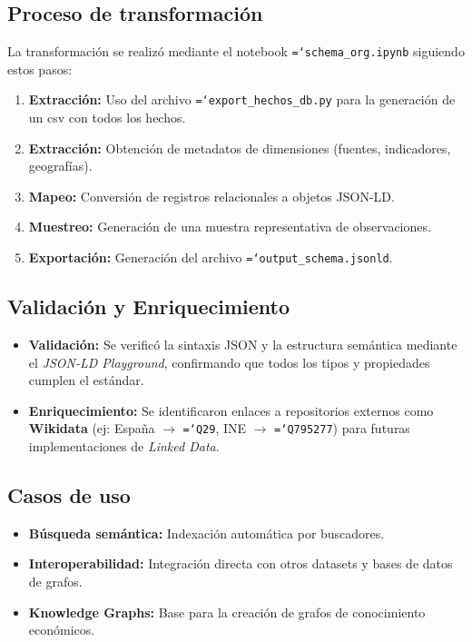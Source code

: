 \documentclass{article}
\let\oldtexttt\texttt  %
\renewcommand{\texttt}[1]{{\footnotesize\oldtexttt{\hyphenchar\font=`\-#1}}}  %
\begin{document}
\subsection{Proceso de transformaci\'on}

La transformaci\'on se realiz\'o mediante el notebook \texttt{schema\_org.ipynb} siguiendo estos pasos:
\begin{enumerate}
    \item \textbf{Extracci\'on:} Uso del archivo \texttt{export\_hechos\_db.py} para la generaci\'on de un csv con todos los hechos.
    \item \textbf{Extracci\'on:} Obtenci\'on de metadatos de dimensiones (fuentes, indicadores, geograf\'ias).
    \item \textbf{Mapeo:} Conversi\'on de registros relacionales a objetos JSON-LD.
    \item \textbf{Muestreo:} Generaci\'on de una muestra representativa de observaciones.
    \item \textbf{Exportaci\'on:} Generaci\'on del archivo \texttt{output\_schema.jsonld}.
\end{enumerate}

\subsection{Validaci\'on y Enriquecimiento}

\begin{itemize}
    \item \textbf{Validaci\'on:} Se verific\'o la sintaxis JSON y la estructura sem\'antica mediante el \textit{JSON-LD Playground}, confirmando que todos los tipos y propiedades cumplen el est\'andar.
    \item \textbf{Enriquecimiento:} Se identificaron enlaces a repositorios externos como \textbf{Wikidata} (ej: Espa\~na $\rightarrow$ \texttt{Q29}, INE $\rightarrow$ \texttt{Q795277}) para futuras implementaciones de \textit{Linked Data}.
\end{itemize}

\subsection{Casos de uso}

\begin{itemize}
    \item \textbf{B\'usqueda sem\'antica:} Indexaci\'on autom\'atica por buscadores.
    \item \textbf{Interoperabilidad:} Integraci\'on directa con otros datasets y bases de datos de grafos.
    \item \textbf{Knowledge Graphs:} Base para la creaci\'on de grafos de conocimiento econ\'omicos.
\end{itemize}
\end{document}
